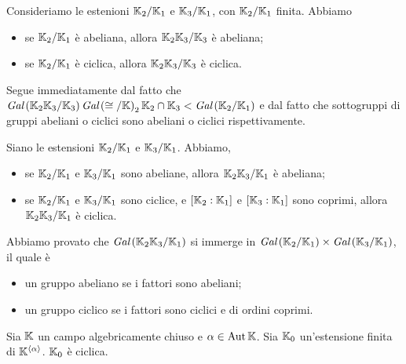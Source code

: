 \EndProof
\begin{Theorem}
	Consideriamo le estenioni
	$\mathbb{K}_2/\mathbb{K}_1$ e
	$\mathbb{K}_3/\mathbb{K}_1$, con
	$\mathbb{K}_2/\mathbb{K}_1$ finita.
	Abbiamo
	\begin{itemize}
		\item
		se $\mathbb{K}_2/\mathbb{K}_1$ \`e abeliana,
		allora
		$\mathbb{K}_2\mathbb{K}_3/\mathbb{K}_3$ \`e abeliana;
		\item
		se $\mathbb{K}_2/\mathbb{K}_1$ \`e ciclica,
		allora
		$\mathbb{K}_2\mathbb{K}_3/\mathbb{K}_3$ \`e ciclica.
	\end{itemize}
\end{Theorem}
\Proof
Segue immediatamente dal fatto che
$\textit{Gal} \left ( \mathbb{K}_2\mathbb{K}_3/\mathbb{K}_3 \right ) \textit{Gal} \left ( \cong/\mathbb{K} \right )_2{\mathbb{K}_2 \cap \mathbb{K}_3} <
\textit{Gal} \left ( \mathbb{K}_2/\mathbb{K}_1 \right )$ e dal fatto che sottogruppi di gruppi
abeliani o ciclici sono abeliani o ciclici rispettivamente.
\EndProof
\begin{Theorem}
	Siano le estensioni
	$\mathbb{K}_2/\mathbb{K}_1$ e
	$\mathbb{K}_3/\mathbb{K}_1$.
	Abbiamo,
	\begin{itemize}
		\item
		se
		$\mathbb{K}_2/\mathbb{K}_1$ e
		$\mathbb{K}_3/\mathbb{K}_1$ sono abeliane,
		allora
		$\mathbb{K}_2\mathbb{K}_3/\mathbb{K}_1$ \`e abeliana;
		\item
		se
		$\mathbb{K}_2/\mathbb{K}_1$ e
		$\mathbb{K}_3/\mathbb{K}_1$ sono ciclice,
		e
		$[\mathbb{K}_2:\mathbb{K}_1]$ e
		$[\mathbb{K}_3:\mathbb{K}_1]$ sono coprimi,
		allora
		$\mathbb{K}_2\mathbb{K}_3/\mathbb{K}_1$ \`e ciclica.
	\end{itemize}
\end{Theorem}
\Proof
Abbiamo provato che
$\textit{Gal} \left ( \mathbb{K}_2\mathbb{K}_3/\mathbb{K}_1 \right )$ si immerge in
$\textit{Gal} \left ( \mathbb{K}_2/\mathbb{K}_1 \right ) \times
\textit{Gal} \left ( \mathbb{K}_3/\mathbb{K}_1 \right )$, il quale \`e
\begin{itemize}
	\item un gruppo abeliano se i fattori sono abeliani;
	\item un gruppo ciclico se i fattori sono ciclici e di ordini
	coprimi.
\end{itemize}
\EndProof
\begin{Theorem}
	Sia $\mathbb{K}$ un campo algebricamente chiuso e
	$\alpha \in \operatorname{Aut}{\mathbb{K}}$.
	Sia $\mathbb{K}_0$ un'estensione finita di
	$\mathbb{K}^{\left < \alpha \right >}$.
	$\mathbb{K}_0$ \`e ciclica.
\end{Theorem}
